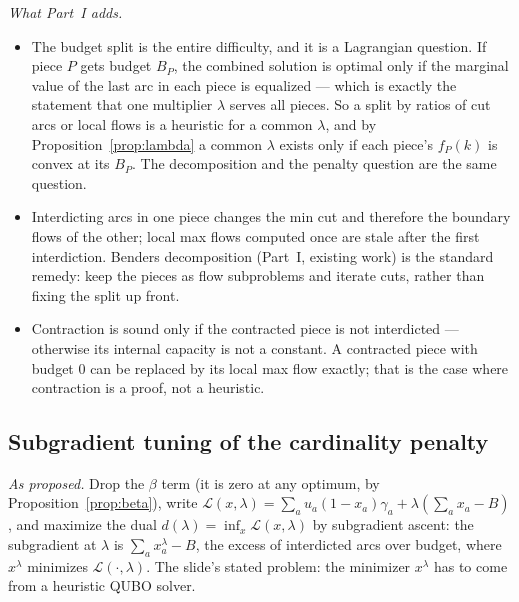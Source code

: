 \documentclass[11pt]{article}
\begin{document}
\emph{What Part~I adds.}
\begin{itemize}[leftmargin=1.5em]
\item The budget split is the entire difficulty, and it is a Lagrangian question. If piece $P$ gets budget $B_P$, the combined solution is optimal only if the marginal value of the last arc in each piece is equalized --- which is exactly the statement that one multiplier $\lambda$ serves all pieces. So a split by ratios of cut arcs or local flows is a heuristic for a common $\lambda$, and by Proposition~\ref{prop:lambda} a common $\lambda$ exists only if each piece's $f_P(k)$ is convex at its $B_P$. The decomposition and the penalty question are the same question.
\item Interdicting arcs in one piece changes the min cut and therefore the boundary flows of the other; local max flows computed once are stale after the first interdiction. Benders decomposition (Part~I, existing work) is the standard remedy: keep the pieces as flow subproblems and iterate cuts, rather than fixing the split up front.
\item Contraction is sound only if the contracted piece is not interdicted --- otherwise its internal capacity is not a constant. A contracted piece with budget $0$ can be replaced by its local max flow exactly; that is the case where contraction is a proof, not a heuristic.
\end{itemize}

\subsection*{Subgradient tuning of the cardinality penalty}

\emph{As proposed.} Drop the $\beta$ term (it is zero at any optimum, by Proposition~\ref{prop:beta}), write $\mathcal L(x,\lambda) = \sum_a u_a(1-x_a)\gamma_a + \lambda(\sum_a x_a - B)$, and maximize the dual $d(\lambda) = \inf_x \mathcal L(x,\lambda)$ by subgradient ascent: the subgradient at $\lambda$ is $\sum_a x^\lambda_a - B$, the excess of interdicted arcs over budget, where $x^\lambda$ minimizes $\mathcal L(\cdot,\lambda)$. The slide's stated problem: the minimizer $x^\lambda$ has to come from a heuristic QUBO solver.
\end{document}
